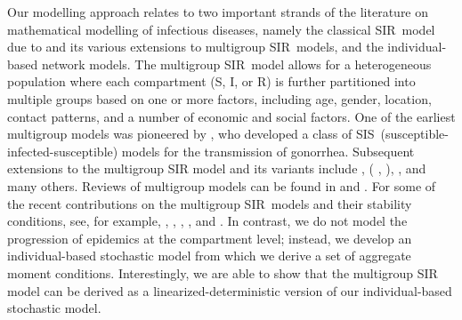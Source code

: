 \documentclass[12pt]{article}
\begin{document}
Our modelling approach relates to two important strands of the literature on
mathematical modelling of infectious diseases, namely the classical SIR\ model
due to \cite{Kermack1927SIR} and its various extensions to multigroup
SIR\ models, and the individual-based network models. The multigroup
SIR\ model allows for a heterogeneous population where each compartment (S, I,
or R) is further partitioned into multiple groups based on one or more
factors, including age, gender, location, contact patterns, and a number of
economic and social factors. One of the earliest multigroup models was
pioneered by \cite{Lajmanovich1976multigroupSIS}, who developed a class of
SIS\ (susceptible-infected-susceptible) models for the transmission of
gonorrhea. Subsequent extensions to the multigroup SIR model and its variants
include \cite{Hethcote1978multi},
\citeauthor{Thieme1983global}
(%
\citeyear{Thieme1983global}%
,
\citeyear{Thieme1985local}%
), \cite{Beretta1986multiSIR}, and many others. Reviews of multigroup models
can be found in \cite{Hethcote2000SIAM} and \cite{Thieme2013book}. For some of
the recent contributions on the multigroup SIR\ models and their stability
conditions, see, for example,
\citet*{Hyman1999differential}%
,
\citet*{Guo2006global}%
,
\citet*{Li2010global}%
,
\citet*{Ji2011multiSIR}%
,
\citet*{Ding2015lyapunov}
and
\citet*{Zhou2017stability}%
. In contrast, we do not model the progression of epidemics at the compartment
level; instead, we develop an individual-based stochastic model from which we
derive a set of aggregate moment conditions. Interestingly, we are able to
show that the multigroup SIR model can be derived as a
linearized-deterministic version of our individual-based stochastic model.
\end{document}
